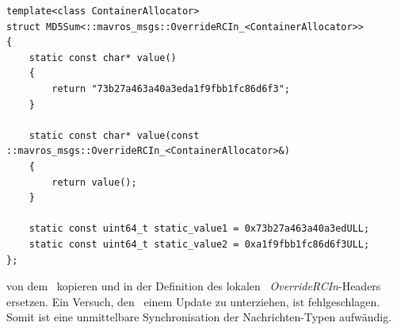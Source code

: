 \begin{lstlisting}[style=Style_CPP, numbers=none, caption=Definition des Struct \CodeStruct{MD5Sum} für das Template \textit{OverrideRCIn}]
template<class ContainerAllocator>
struct MD5Sum<::mavros_msgs::OverrideRCIn_<ContainerAllocator>>
{
	static const char* value()
	{
		return "73b27a463a40a3eda1f9fbb1fc86d6f3";
	}

	static const char* value(const ::mavros_msgs::OverrideRCIn_<ContainerAllocator>&)
	{
		return value();
	}
	
	static const uint64_t static_value1 = 0x73b27a463a40a3edULL;
	static const uint64_t static_value2 = 0xa1f9fbb1fc86d6f3ULL;
};
\end{lstlisting}

von dem \Pie\ kopieren und in der Definition des lokalen \ROS\ \textit{\mbox{OverrideRCIn}}-Headers ersetzen.
Ein Versuch, den \Pie\ einem Update zu unterziehen, ist fehlgeschlagen. Somit ist eine unmittelbare Synchronisation der Nachrichten-Typen aufwändig.


